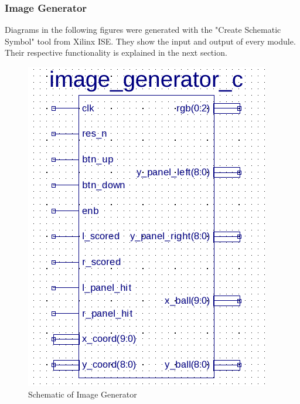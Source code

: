 \documentclass[12pt]{article}
\begin{document}
		\subsubsection{Image Generator}
		Diagrams in the following figures were generated with the "Create Schematic Symbol" tool from Xilinx ISE. They show the input and output of every module. Their respective functionality is explained in the next section.
	\begin{figure}[h]
		\centering
		\includegraphics[scale=0.4]{images/image_generator_c.png}
		\caption{Schematic of Image Generator}
		\label{image_generator}
	\end{figure}
		
\end{document}
